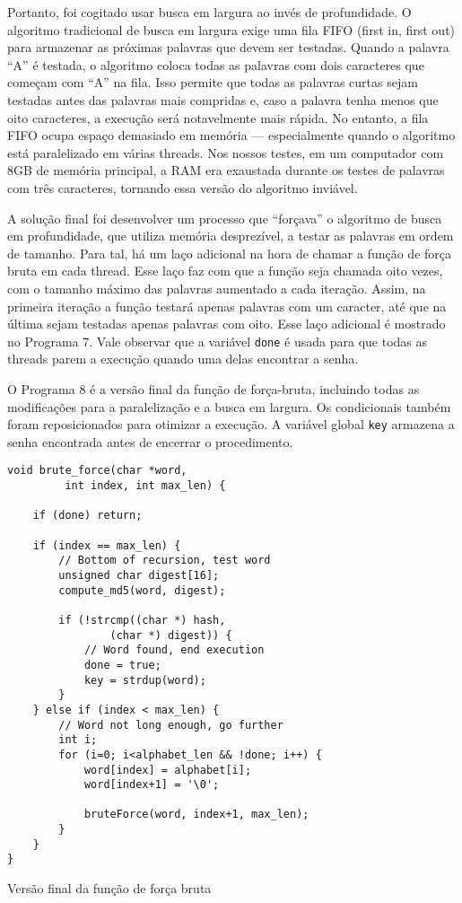 \documentclass{sig-alternate-05-2015}
\begin{document}
Portanto, foi cogitado usar busca em largura ao invés de profundidade.
O algoritmo tradicional de busca em largura exige uma fila FIFO (first in, first out) para armazenar as próximas palavras que devem ser testadas.
Quando a palavra ``A'' é testada, o algoritmo coloca todas as palavras com dois caracteres que começam com ``A'' na fila.
Isso permite que todas as palavras curtas sejam testadas antes das palavras mais compridas e, caso a palavra tenha menos que oito caracteres, a execução será notavelmente mais rápida.
No entanto, a fila FIFO ocupa espaço demasiado em memória — especialmente quando o algoritmo está paralelizado em várias threads.
Nos nossos testes, em um computador com 8GB de memória principal, a RAM era exaustada durante os testes de palavras com três caracteres, tornando essa versão do algoritmo inviável.

A solução final foi desenvolver um processo que ``forçava'' o algoritmo de busca em profundidade, que utiliza memória desprezível, a testar as palavras em ordem de tamanho.
Para tal, há um laço adicional na hora de chamar a função de força bruta em cada thread.
Esse laço faz com que a função seja chamada oito vezes, com o tamanho máximo das palavras aumentado a cada iteração.
Assim, na primeira iteração a função testará apenas palavras com um caracter, até que na última sejam testadas apenas palavras com oito.
Esse laço adicional é mostrado no Programa 7.
Vale observar que a variável \texttt{done} é usada para que todas as threads parem a execução quando uma delas encontrar a senha.

O Programa 8 é a versão final da função de força-bruta, incluindo todas as modificações para a paralelização e a busca em largura.
Os condicionais também foram reposicionados para otimizar a execução.
A variável global \texttt{key} armazena a senha encontrada antes de encerrar o procedimento.

\begin{program}
\begin{lstlisting}
void brute_force(char *word,
         int index, int max_len) {

    if (done) return;
    
    if (index == max_len) {
    	// Bottom of recursion, test word
        unsigned char digest[16];
        compute_md5(word, digest);

        if (!strcmp((char *) hash, 
        		(char *) digest)) {
        	// Word found, end execution
            done = true;
            key = strdup(word);
        }
    } else if (index < max_len) {
    	// Word not long enough, go further
        int i;
        for (i=0; i<alphabet_len && !done; i++) {
            word[index] = alphabet[i];
            word[index+1] = '\0';

            bruteForce(word, index+1, max_len);
        }
    }
}
\end{lstlisting}
\caption{Versão final da função de força bruta}
\end{program}
\end{document}

